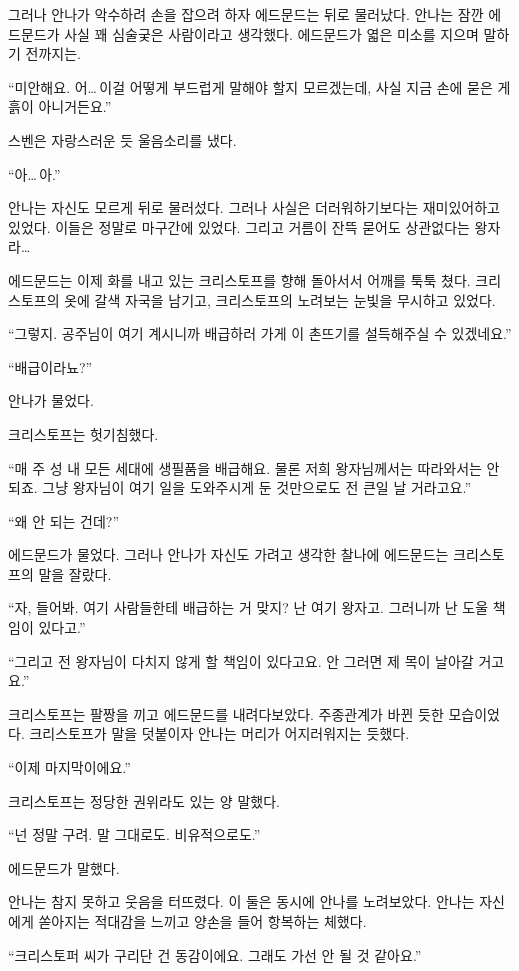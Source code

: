 그러나 안나가 악수하려 손을 잡으려 하자 에드문드는 뒤로 물러났다. 안나는 잠깐 에드문드가 사실 꽤 심술궂은 사람이라고 생각했다. 에드문드가 엷은 미소를 지으며 말하기 전까지는.

``미안해요. 어\ldots\,이걸 어떻게 부드럽게 말해야 할지 모르겠는데, 사실 지금 손에 묻은 게 흙이 아니거든요.''

스벤은 자랑스러운 듯 울음소리를 냈다.

``아\ldots\,아.''

안나는 자신도 모르게 뒤로 물러섰다. 그러나 사실은 더러워하기보다는 재미있어하고 있었다. 이들은 정말로 마구간에 있었다. 그리고 거름이 잔뜩 묻어도 상관없다는 왕자라\ldots

에드문드는 이제 화를 내고 있는 크리스토프를 향해 돌아서서 어깨를 툭툭 쳤다. 크리스토프의 옷에 갈색 자국을 남기고, 크리스토프의 노려보는 눈빛을 무시하고 있었다.

``그렇지. 공주님이 여기 계시니까 배급하러 가게 이 촌뜨기를 설득해주실 수 있겠네요.''

``배급이라뇨?''

안나가 물었다.

크리스토프는 헛기침했다.

``매 주 성 내 모든 세대에 생필품을 배급해요. 물론 저희 왕자님께서는 따라와서는 안 되죠. 그냥 왕자님이 여기 일을 도와주시게 둔 것만으로도 전 큰일 날 거라고요.''

``왜 안 되는 건데?''

에드문드가 물었다. 그러나 안나가 자신도 가려고 생각한 찰나에 에드문드는 크리스토프의 말을 잘랐다.

``자, 들어봐. 여기 사람들한테 배급하는 거 맞지? 난 여기 왕자고. 그러니까 난 도울 책임이 있다고.''

``그리고 전 왕자님이 다치지 않게 할 책임이 있다고요. 안 그러면 제 목이 날아갈 거고요.''

크리스토프는 팔짱을 끼고 에드문드를 내려다보았다. 주종관계가 바뀐 듯한 모습이었다. 크리스토프가 말을 덧붙이자 안나는 머리가 어지러워지는 듯했다.

``이제 마지막이에요.''

크리스토프는 정당한 권위라도 있는 양 말했다.

``넌 정말 구려. 말 그대로도. 비유적으로도.''

에드문드가 말했다.

안나는 참지 못하고 웃음을 터뜨렸다. 이 둘은 동시에 안나를 노려보았다. 안나는 자신에게 쏟아지는 적대감을 느끼고 양손을 들어 항복하는 체했다.

``크리스토퍼 씨가 구리단 건 동감이에요. 그래도 가선 안 될 것 같아요.''

